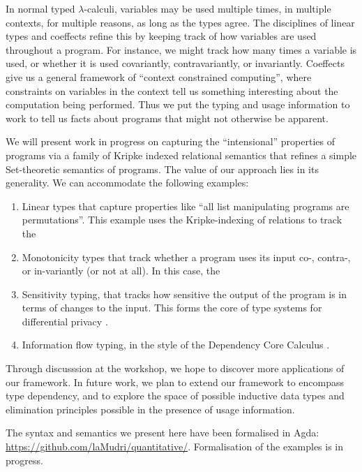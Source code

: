 In normal typed $\lambda$-calculi, variables may be used multiple
times, in multiple contexts, for multiple reasons, as long as the
types agree. The disciplines of linear types \cite{girard} and
coeffects \cite{petricek,brunel,ghica} refine this by keeping track of
how variables are used throughout a program. For instance, we might
track how many times a variable is used, or whether it is used
covariantly, contravariantly, or invariantly. Coeffects give us a
general framework of ``context constrained computing'', where
constraints on variables in the context tell us something interesting
about the computation being performed. Thus we put the typing and
usage information to work to tell us facts about programs that might
not otherwise be apparent.

We will present work in progress on capturing the ``intensional''
properties of programs via a family of Kripke indexed relational
semantics that refines a simple Set-theoretic semantics of
programs. The value of our approach lies in its generality. We can
accommodate the following examples:
\begin{enumerate}
\item Linear types that capture properties like ``all list
  manipulating programs are permutations''. This example uses the
  Kripke-indexing of relations to track the 
\item Monotonicity types that track whether a program uses its input
  co-, contra-, or in-variantly (or not at all). In this case, the 
\item Sensitivity typing, that tracks how sensitive the output of the
  program is in terms of changes to the input. This forms the core of
  type systems for differential privacy \cite{reed}.
\item Information flow typing, in the style of the Dependency Core
  Calculus \cite{abadi}.
\end{enumerate}
Through discusssion at the workshop, we hope to discover more
applications of our framework. In future work, we plan to extend our
framework to encompass type dependency, and to explore the space of
possible inductive data types and elimination principles possible in
the presence of usage information.

The syntax and semantics we present here have been formalised in Agda:
\url{https://github.com/laMudri/quantitative/}. Formalisation of the
examples is in progress.

